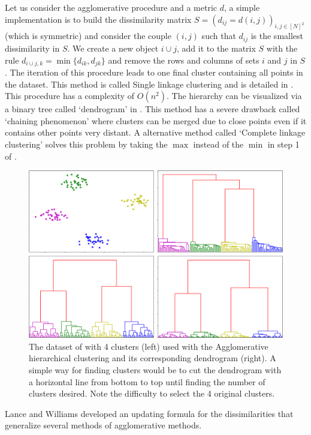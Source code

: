 Let us consider the agglomerative procedure and a metric $d$, a simple implementation is to build the dissimilarity matrix $S=(d_{ij}=d(i,j))_{i,j\in [N]^2}$ (which is symmetric) and consider the couple $(i,j)$ such that $d_{ij}$ is the smallest dissimilarity in $S$. We create a new object $i \cup j$, add it to the matrix $S$ with the rule $d_{i\cup j, k}=\min\{d_{ik},d_{jk}\}$ and remove the rows and columns of sets $i$ and $j$ in $S$. The iteration of this procedure leads to one final cluster containing all points in the dataset. This method is called Single linkage clustering \citep{Graham:1985:HMS:1435654.1436662} and is detailed in . This procedure has a complexity of $O(n^2)$\citep{hierarchicalMurtagh}. The hierarchy can be visualized via a binary tree called `dendrogram' in . This method has a severe drawback called `chaining phenomenon' where clusters can be merged due to close points even if it contains other points very distant. A alternative method called `Complete linkage clustering' solves this problem by taking the $\max$ instead of the $\min$ in step 1 of . 
 \begin{figure}[h]
 \center
 \includegraphics[scale=0.35]{TeX_files/dendrogram.png}
 \caption{The dataset of  with 4 clusters (left) used with the Agglomerative hierarchical clustering and its corresponding dendrogram (right). A simple way for finding clusters would be to cut the dendrogram with a horizontal line from bottom to top until finding the number of clusters desired. Note the difficulty to select the 4 original clusters.}
 \label{dendrogram_graph}
 \end{figure}
Lance and Williams developed an updating formula \citep{lance_williams_67} for the dissimilarities that generalize several methods of agglomerative methods. 
